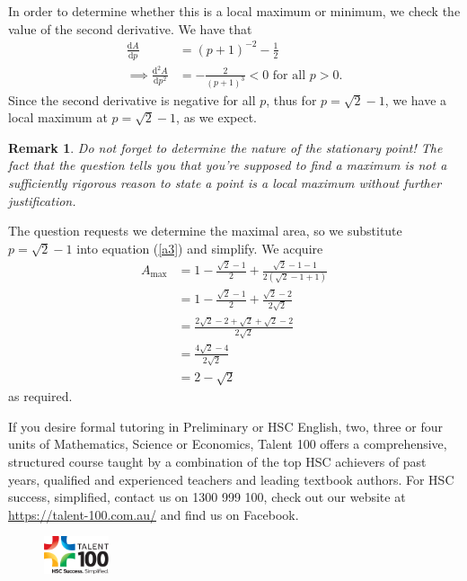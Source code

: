 \documentclass[a4paper,11pt]{article}
\newcommand{\diff}[2]{\frac{\mathrm{d}#1}{\mathrm{d}#2}}
\newcommand{\ndiff}[3]{\frac{\mathrm{d}^{#3}#1}{\mathrm{d}#2^{#3}}}
\newtheorem*{remark}{Remark}
\begin{document}
\noindent In order to determine whether this is a local maximum or minimum, we check the value of the second derivative. We have that
\begin{align*}
\diff{A}{p} &= (p+1)^{-2}-\frac{1}{2}\\
\implies \ndiff{A}{p}{2} &= -\frac{2}{(p+1)^3} < 0 \text{ for all }p>0.
\end{align*}
Since the second derivative is negative for all $p$, thus for $p=\sqrt{2}-1$, we have a local maximum at $p=\sqrt{2}-1$, as we expect.
\begin{remark}\normalfont
Do not forget to determine the nature of the stationary point! The fact that the question tells you that you're supposed to find a maximum is not a sufficiently rigorous reason to state a point is a local maximum without further justification.
\end{remark}
\noindent The question requests we determine the maximal area, so we substitute $p=\sqrt{2}-1$ into equation (\ref{a3}) and simplify. We acquire
\begin{align*}
A_{\text{max}} &= 1 - \frac{\sqrt{2}-1}{2} +\frac{\sqrt{2}-1-1}{2(\sqrt{2}-1+1)}\\
&= 1 - \frac{\sqrt{2}-1}{2} + \frac{\sqrt{2}-2}{2\sqrt{2}}\\
&= \frac{2\sqrt{2}-2+\sqrt{2}+\sqrt{2}-2}{2\sqrt{2}}\\
&= \frac{4\sqrt{2}-4}{2\sqrt{2}}\\
&= 2-\sqrt{2}
\end{align*}
as required.

\vspace{2cm}

If you desire formal tutoring in Preliminary or HSC English, two, three or four units of Mathematics, Science or Economics, Talent 100 offers a comprehensive, structured course taught by a combination of the top HSC achievers of past years, qualified and experienced teachers and leading textbook authors. For HSC success, simplified, contact us on 1300 999 100, check out our website at \url{https://talent-100.com.au/} and find us on Facebook. 

\vfill

\begin{figure}[H]
\centering
\includegraphics[width=0.17\textwidth]{t100.png}
\end{figure}
\end{document}
